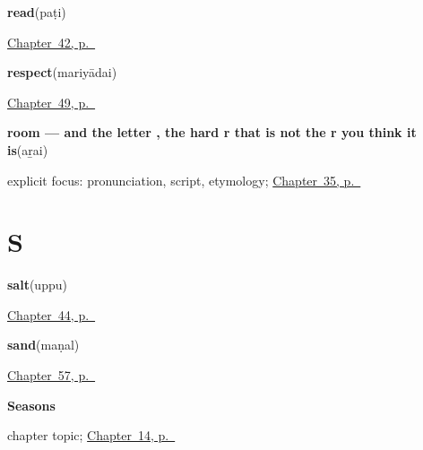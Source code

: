 \noindent\begin{minipage}[t]{\linewidth}
\raggedright
\textbf{read}\enspace\emph{}\enspace(paṭi)\par
\footnotesize \hyperref[ch:ta-more-verbs]{Chapter~42, p.~\pageref*{ch:ta-more-verbs}}
\end{minipage}\par\smallskip

\noindent\begin{minipage}[t]{\linewidth}
\raggedright
\textbf{respect}\enspace\emph{}\enspace(mariyādai)\par
\footnotesize \hyperref[ch:ta-courtesy]{Chapter~49, p.~\pageref*{ch:ta-courtesy}}
\end{minipage}\par\smallskip

\noindent\begin{minipage}[t]{\linewidth}
\raggedright
\textbf{room — and the letter , the hard r that is not the r you think it is}\enspace\emph{}\enspace(aṟai)\par
\footnotesize explicit focus: pronunciation, script, etymology; \hyperref[ch:ta-arriving-at-a-house]{Chapter~35, p.~\pageref*{ch:ta-arriving-at-a-house}}
\end{minipage}\par\smallskip

\section*{S}

\noindent\begin{minipage}[t]{\linewidth}
\raggedright
\textbf{salt}\enspace\emph{}\enspace(uppu)\par
\footnotesize \hyperref[ch:ta-things-you-ask-for]{Chapter~44, p.~\pageref*{ch:ta-things-you-ask-for}}
\end{minipage}\par\smallskip

\noindent\begin{minipage}[t]{\linewidth}
\raggedright
\textbf{sand}\enspace\emph{}\enspace(maṇal)\par
\footnotesize \hyperref[ch:ta-wind-and-fire]{Chapter~57, p.~\pageref*{ch:ta-wind-and-fire}}
\end{minipage}\par\smallskip

\noindent\begin{minipage}[t]{\linewidth}
\raggedright
\textbf{Seasons}\par
\footnotesize chapter topic; \hyperref[ch:ta-seasons]{Chapter~14, p.~\pageref*{ch:ta-seasons}}
\end{minipage}\par\smallskip

